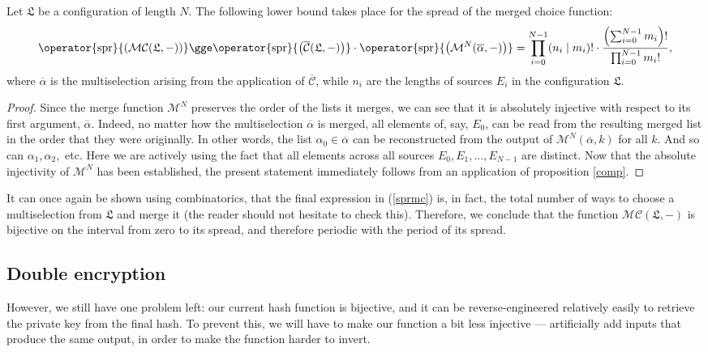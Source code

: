 \documentclass[12pt, a4paper]{article}
\newcommand{\C}{\mathcal{C}}
\newcommand{\CC}{\overline{\mathcal{C}}}
\newcommand{\M}{\mathcal{M}}
\newcommand{\conf}{\mathfrak{L}}
\newcommand{\spr}[1]{\operator{\mathrm{spr}}{\left(#1\right)}}
\begin{document}
\begin{proposition}
    Let $ \conf $ be a configuration of length $ N $. The following lower bound takes place for the spread of the merged choice function:
    \begin{equation}\label{sprmc}
        \spr{\M\C(\conf, -)} \gge \spr{\CC(\conf, -)} \cdot \spr{\M^N(\overline{\alpha}, -)} = \prod\limits_{i = 0}^{N-1} (n_i \mid m_i)! \cdot \frac{\left( \sum\nolimits_{i = 0}^{N-1} m_i \right)!}{\prod\nolimits_{i = 0}^{N-1} m_i!},
    \end{equation}
    where $ \overline{\alpha} $ is the multiselection arising from the application of $ \CC $, while $ n_i $ are the lengths of sources $ E_i $ in the configuration $ \conf $.
\end{proposition}
\begin{proof}
    Since the merge function $ \M^N $ preserves the order of the lists it merges, we can see that it is absolutely injective with respect to its first argument, $ \overline{\alpha} $. Indeed, no matter how the multiselection $ \overline{\alpha} $ is merged, all elements of, say, $ E_0 $, can be read from the resulting merged list in the order that they were originally. In other words, the list $ \alpha_0 \in \overline{\alpha} $ can be reconstructed from the output of $ \M^N(\overline{\alpha}, k) $ for all $ k $. And so can $ \alpha_1, \alpha_2, $ etc. Here we are actively using the fact that all elements across all sources $ E_0, E_1, ..., E_{N-1} $ are distinct. Now that the absolute injectivity of $ \M^N $ has been established, the present statement immediately follows from an application of proposition \ref{comp}.
\end{proof}

It can once again be shown using combinatorics, that the final expression in (\ref{sprmc}) is, in fact, the total number of ways to choose a multiselection from $ \conf $ and merge it (the reader should not hesitate to check this). Therefore, we conclude that the function $ \M\C(\conf, -) $ is bijective on the interval from zero to its spread, and therefore periodic with the period of its spread.

\subsection{Double encryption}

However, we still have one problem left: our current hash function is bijective, and it can be reverse-engineered relatively easily to retrieve the private key from the final hash. To prevent this, we will have to make our function a bit less injective --- artificially add inputs that produce the same output, in order to make the function harder to invert.
\end{document}

